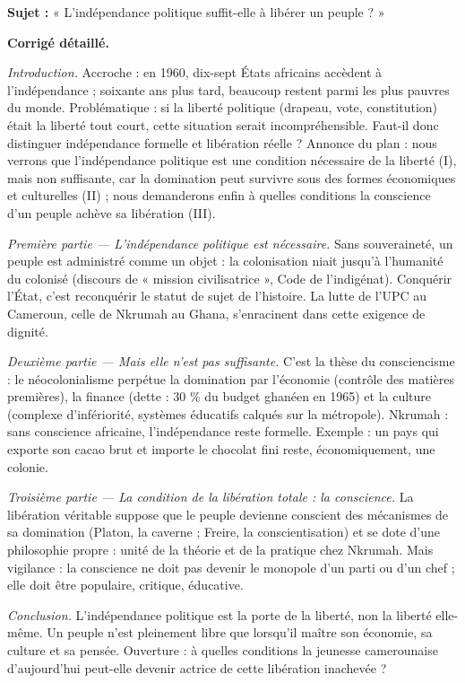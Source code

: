 \documentclass[11pt]{article}
\begin{document}
\begin{exoresolu}
\textbf{Sujet :} « L'indépendance politique suffit-elle à libérer un peuple ? »

\tcblower

\textbf{Corrigé détaillé.}

\emph{Introduction.} Accroche : en 1960, dix-sept États africains accèdent à l'indépendance ; soixante ans plus tard, beaucoup restent parmi les plus pauvres du monde. Problématique : si la liberté politique (drapeau, vote, constitution) était la liberté tout court, cette situation serait incompréhensible. Faut-il donc distinguer indépendance formelle et libération réelle ? Annonce du plan : nous verrons que l'indépendance politique est une condition nécessaire de la liberté (I), mais non suffisante, car la domination peut survivre sous des formes économiques et culturelles (II) ; nous demanderons enfin à quelles conditions la conscience d'un peuple achève sa libération (III).

\emph{Première partie — L'indépendance politique est nécessaire.} Sans souveraineté, un peuple est administré comme un objet : la colonisation niait jusqu'à l'humanité du colonisé (discours de « mission civilisatrice », Code de l'indigénat). Conquérir l'État, c'est reconquérir le statut de sujet de l'histoire. La lutte de l'UPC au Cameroun, celle de Nkrumah au Ghana, s'enracinent dans cette exigence de dignité.

\emph{Deuxième partie — Mais elle n'est pas suffisante.} C'est la thèse du consciencisme : le néocolonialisme perpétue la domination par l'économie (contrôle des matières premières), la finance (dette : 30 \% du budget ghanéen en 1965) et la culture (complexe d'infériorité, systèmes éducatifs calqués sur la métropole). Nkrumah : sans conscience africaine, l'indépendance reste formelle. Exemple : un pays qui exporte son cacao brut et importe le chocolat fini reste, économiquement, une colonie.

\emph{Troisième partie — La condition de la libération totale : la conscience.} La libération véritable suppose que le peuple devienne conscient des mécanismes de sa domination (Platon, la caverne ; Freire, la conscientisation) et se dote d'une philosophie propre : unité de la théorie et de la pratique chez Nkrumah. Mais vigilance : la conscience ne doit pas devenir le monopole d'un parti ou d'un chef ; elle doit être populaire, critique, éducative.

\emph{Conclusion.} L'indépendance politique est la porte de la liberté, non la liberté elle-même. Un peuple n'est pleinement libre que lorsqu'il maître son économie, sa culture et sa pensée. Ouverture : à quelles conditions la jeunesse camerounaise d'aujourd'hui peut-elle devenir actrice de cette libération inachevée ?
\end{exoresolu}
\end{document}
